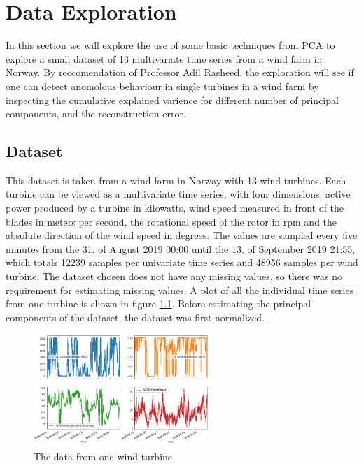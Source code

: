 \chapter{Data Exploration} \label{chap:data_exp}

In this section we will explore the use of some basic techniques from PCA to explore a small dataset of 13 multivariate time series from a wind farm in Norway.  
By reccomendation of Professor Adil Rasheed, the exploration will see if one can detect anomolous behaviour in single turbines in a wind farm by inspecting the cumulative explained varience for different number of principal components, and the reconstruction error.

\section{Dataset}

This dataset is taken from a wind farm in Norway with 13 wind turbines. 
Each turbine can be viewed as a multivariate time series, with four dimensions: active power produced by a turbine in kilowatts, wind speed measured in front of the blades in meters per second, the rotational speed of the rotor in rpm and the absolute direction of the wind speed in degrees. 
The values are sampled every five minutes from the 31. of August 2019 00:00 until the 13. of September 2019 21:55, which totals 12239 samples per univariate time series and 48956 samples per wind turbine. 
The dataset chosen does not have any missing values, so there was no requirement for estimating missing values. 
A plot of all the individual time series from one turbine is shown in figure \ref{fig:data_one_wt}.
Before estimating the principal components of the dataset, the dataset was first normalized. \bigskip

\begin{figure}
    \begin{center}
    \includegraphics[width=0.6\textwidth]{data_exp/one_turbine_all_vals}
    \end{center}
    \caption{The data from one wind turbine} 
    \label{fig:data_one_wt}
\end{figure}

